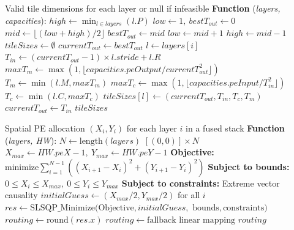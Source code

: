 \documentclass[conference]{IEEEtran}
\begin{document}
\begin{algorithm}[htbp]
\caption{Polyfuse Analytical Tiler for Fused CNN Layers}
\label{alg:polyfuse_tiler}
\begin{algorithmic}[1]
\renewcommand{\algorithmicrequire}{\textbf{Result:}}
\REQUIRE Valid tile dimensions for each layer or null if infeasible
\STATE \textbf{Function} (\textit{layers, capacities}):
\STATE $high \leftarrow \min_{l \in layers} (l.P)$
\STATE $low \leftarrow 1, \ bestT_{out} \leftarrow 0$
    \STATE $mid \leftarrow \lfloor (low + high) / 2 \rfloor$
        \STATE $bestT_{out} \leftarrow mid$
        \STATE $low \leftarrow mid + 1$
    \ELSE
        \STATE $high \leftarrow mid - 1$
    \ENDIF
\ENDWHILE
{}
    \RETURN {}
\ENDIF
\STATE $tileSizes \leftarrow \emptyset$
\STATE $currentT_{out} \leftarrow bestT_{out}$
    \STATE $l \leftarrow \textit{layers}[i]$
    \STATE $T_{in} \leftarrow (currentT_{out} - 1) \times l.stride + l.R$
    \STATE $maxT_m \leftarrow \max(1, \lfloor \textit{capacities.peOutput} / currentT_{out}^2 \rfloor)$
    \STATE $T_m \leftarrow \min(l.M, maxT_m)$
    \STATE $maxT_c \leftarrow \max(1, \lfloor \textit{capacities.peInput} / T_{in}^2 \rfloor)$
    \STATE $T_c \leftarrow \min(l.C, maxT_c)$
    \STATE $tileSizes[l] \leftarrow (currentT_{out}, T_{in}, T_c, T_m)$
    \STATE $currentT_{out} \leftarrow T_{in}$
\ENDFOR
\RETURN $tileSizes$
\end{algorithmic}
\end{algorithm}

\begin{algorithm}[htbp]
\caption{Polyfuse Spatial Router}
\label{alg:polyfuse_router}
\begin{algorithmic}[1]
\renewcommand{\algorithmicrequire}{\textbf{Result:}}
\REQUIRE Spatial PE allocation $(X_i, Y_i)$ for each layer $i$ in a fused stack
\STATE \textbf{Function} (\textit{layers, HW}):
\STATE $N \leftarrow \text{length}(\textit{layers})$
    \RETURN $[(0, 0)] \times N$
\ENDIF
\STATE $X_{max} \leftarrow HW.peX - 1, \ Y_{max} \leftarrow HW.peY - 1$
\STATE \textbf{Objective:} $\text{minimize} \sum_{i=1}^{N-1} ((X_{i+1} - X_i)^2 + (Y_{i+1} - Y_i)^2)$
\STATE \textbf{Subject to bounds:} $0 \leq X_i \leq X_{max}, \ 0 \leq Y_i \leq Y_{max}$
\STATE \textbf{Subject to constraints:} Extreme vector causality
\STATE $initialGuess \leftarrow (X_{max}/2, Y_{max}/2)$ for all $i$
\STATE $res \leftarrow \text{SLSQP\_Minimize}(\text{Objective}, initialGuess,$
\STATE \hspace{\algorithmicindent} $\text{bounds}, \text{constraints})$
    \STATE $routing \leftarrow \text{round}(res.x)$
\ELSE
    \STATE $routing \leftarrow \text{fallback linear mapping}$
\ENDIF
\RETURN $routing$
\end{algorithmic}
\end{algorithm}
\end{document}
